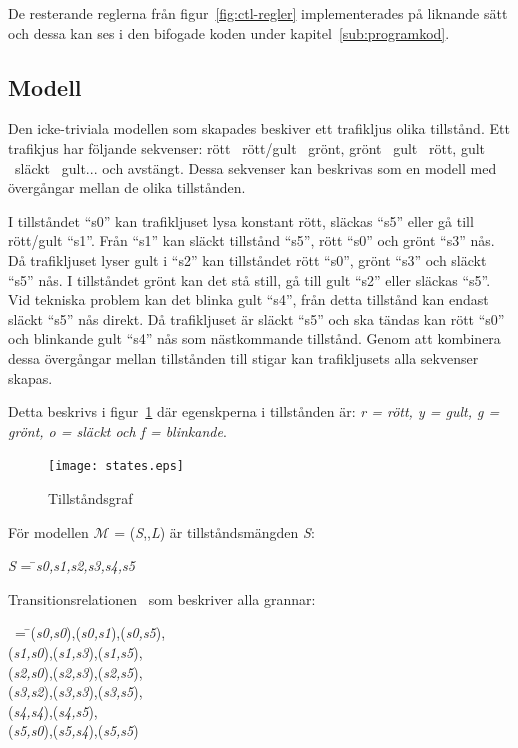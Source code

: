 De resterande reglerna från figur~\ref{fig:ctl-regler} implementerades på liknande sätt och dessa kan ses i den bifogade koden under kapitel~\ref{sub:programkod}.

\subsection{Modell}\label{sub:modell}

Den icke-triviala modellen som skapades beskiver ett trafikljus olika tillstånd. Ett trafikjus har följande sekvenser: rött \textrightarrow\ rött/gult \textrightarrow\ grönt, grönt \textrightarrow\ gult \textrightarrow\ rött, gult \textrightarrow\ släckt  \textrightarrow\ gult... och avstängt. Dessa sekvenser kan beskrivas som en modell med övergångar mellan de olika tillstånden.

I tillståndet “s0” kan trafikljuset lysa konstant rött, släckas “s5” eller gå till rött/gult “s1”. Från “s1” kan släckt tillstånd “s5”, rött “s0” och grönt “s3” nås. Då trafikljuset lyser gult i “s2” kan tillståndet rött “s0”, grönt “s3” och släckt “s5” nås. I tillståndet grönt kan det stå still, gå till gult “s2” eller släckas “s5”. Vid tekniska problem kan det blinka gult “s4”, från detta tillstånd kan endast släckt “s5” nås direkt. Då trafikljuset är släckt “s5” och ska tändas kan rött “s0” och blinkande gult “s4” nås som nästkommande tillstånd. Genom att kombinera dessa övergångar mellan tillstånden till stigar kan trafikljusets alla sekvenser skapas.

Detta beskrivs i figur~\ref{fig:ctl-states} där egenskperna i tillstånden är: \textit{r = rött, y = gult, g = grönt, o = släckt och f = blinkande}.

\begin{figure}[here]
\texttt{[image: states.eps]}
\caption{Tillståndsgraf}
\label{fig:ctl-states}
\end{figure}

För modellen $\mathcal{M}$ = (\textit{S},\textrightarrow,\textit{L}) är tillståndsmängden \textit{S}:

\begin{tabbing}
\textit{S} = \= \textbraceleft \textit{s0,s1,s2,s3,s4,s5}\textbraceright\\
\end{tabbing}

Transitionsrelationen \textrightarrow\ som beskriver alla grannar: 
\begin{tabbing}
\textrightarrow\ = \= \textbraceleft (\textit{s0,s0}),(\textit{s0,s1}),(\textit{s0,s5}),\\
\> (\textit{s1,s0}),(\textit{s1,s3}),(\textit{s1,s5}),\\
\> (\textit{s2,s0}),(\textit{s2,s3}),(\textit{s2,s5}),\\
\> (\textit{s3,s2}),(\textit{s3,s3}),(\textit{s3,s5}),\\
\> (\textit{s4,s4}),(\textit{s4,s5}),\\
\> (\textit{s5,s0}),(\textit{s5,s4}),(\textit{s5,s5})\textbraceright\\
\end{tabbing}

